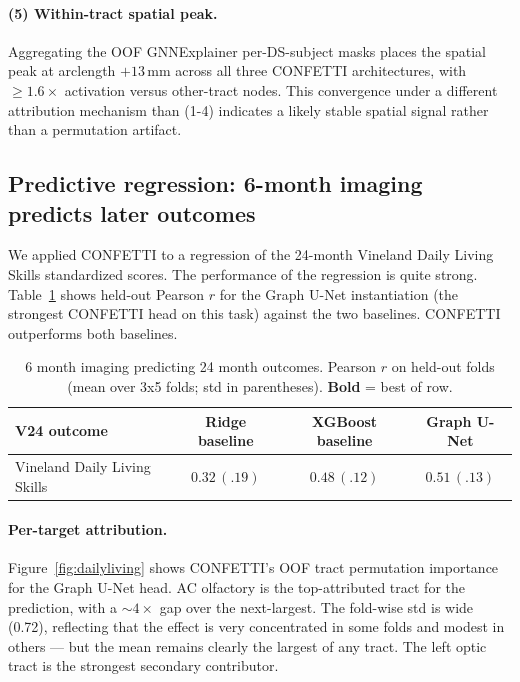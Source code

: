 \documentclass[runningheads]{llncs}
\begin{document}
\paragraph{(5) Within-tract spatial peak.}
Aggregating the OOF GNNExplainer per-DS-subject masks places the spatial peak
at arclength $+13$\,mm across all three CONFETTI architectures, with
$\geq 1.6\times$ activation versus other-tract nodes. This convergence
under a different attribution mechanism than (1-4) indicates a likely stable
spatial signal rather than a permutation artifact.


\subsection{Predictive regression: 6-month imaging predicts later outcomes}

We applied CONFETTI to a regression of the 24-month Vineland Daily Living Skills
standardized scores. The performance of the regression is quite strong.
Table~\ref{tab:reg} shows held-out Pearson $r$ for
the Graph U-Net instantiation (the strongest CONFETTI head on this task)
against the two baselines. CONFETTI outperforms both baselines.

\begin{table}[t]
\centering
\caption{6 month imaging predicting 24 month outcomes. Pearson $r$
on held-out folds (mean over 3x5 folds; std in parentheses). \textbf{Bold} =
best of row.}
\label{tab:reg}
\fontsize{8.5}{10}\selectfont
\begin{tabular}{lccc}
\toprule
V24 outcome & Ridge baseline & XGBoost baseline & Graph U-Net \\
\midrule
Vineland Daily Living Skills         & $0.32\,(.19)$ & $0.48\,(.12)$ & $\mathbf{0.51\,(.13)}$ \\
\bottomrule
\end{tabular}
\end{table}

\paragraph{Per-target attribution.}
Figure~\ref{fig:dailyliving} shows CONFETTI's OOF tract permutation
importance for the Graph U-Net head. AC olfactory is the top-attributed
tract for the prediction, with a $\sim\!4\times$ gap over the next-largest. The fold-wise std is wide (0.72), reflecting that the effect is very concentrated in some folds and modest in others — but the mean remains clearly the largest of any tract. The left optic tract is the strongest secondary contributor.
\end{document}
